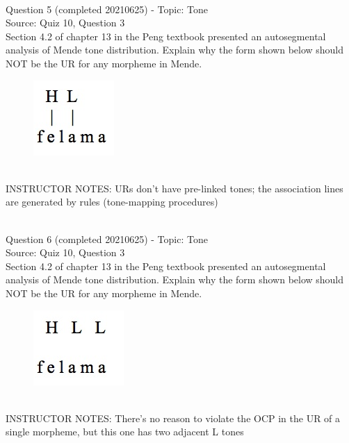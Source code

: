 \documentclass[12pt]{article}
\begin{document}
~\\

{\large Question 5} (completed 20210625) - Topic: Tone\\
Source: Quiz 10, Question 3\\

Section 4.2 of chapter 13 in the Peng textbook presented an autosegmental analysis of Mende tone distribution. Explain why the form shown below should NOT be the UR for any morpheme in Mende.\\

\begin{figure}[H]
\includegraphics{../images/mende_junction_a.png}
\end{figure}

~\\
INSTRUCTOR NOTES: URs don't have pre-linked tones; the association lines are generated by rules (tone-mapping procedures)


~\\

{\large Question 6} (completed 20210625) - Topic: Tone\\
Source: Quiz 10, Question 3\\

Section 4.2 of chapter 13 in the Peng textbook presented an autosegmental analysis of Mende tone distribution. Explain why the form shown below should NOT be the UR for any morpheme in Mende.\\

\begin{figure}[H]
\includegraphics{../images/mende_junction_b.png}
\end{figure}

~\\
INSTRUCTOR NOTES: There's no reason to violate the OCP in the UR of a single morpheme, but this one has two adjacent L tones
\end{document}

